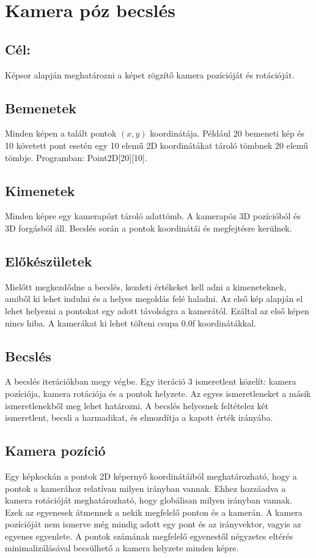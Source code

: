 \documentclass{article}
\begin{document}
	
\section{Kamera póz becslés}
\subsection{Cél:}
Képsor alapján meghatározni a képet rögzítő kamera pozícióját és rotációját.

\subsection{Bemenetek}
Minden képen a talált pontok $(x, y)$ koordinátája. Például 20 bemeneti kép és 10 követett pont esetén egy 10 elemű 2D koordinátákat tároló tömbnek 20 elemű tömbje. Programban: Point2D[20][10].

\subsection{Kimenetek}
Minden képre egy kamerapózt tároló adattömb. A kamerapóz 3D pozícióból és 3D forgásból áll. Becslés során a pontok koordinátái és megfejtésre kerülnek.

\subsection{Előkészületek}
Mielőtt megkezdődne a becslés, kezdeti értékeket kell adni a kimeneteknek, amiből ki lehet indulni és a helyes megoldás felé haladni. Az első kép alapján el lehet helyezni a pontokat egy adott távolságra a kamerától. Ezáltal az első képen nincs hiba. A kamerákat ki lehet tölteni csupa 0.0f koordinátákkal.

\subsection{Becslés}
A becslés iterációkban megy végbe. Egy iteráció 3 ismeretlent közelít: kamera pozíciója, kamera rotációja és a pontok helyzete. Az egyes ismeretleneket a másik ismeretlenekből meg lehet határozni. A becslés helyesnek feltételez két ismeretlent, becsli a harmadikat, és elmozdítja a kapott érték irányába.

\subsection{Kamera pozíció}
Egy képkockán a pontok 2D képernyő koordinátáiból meghatározható, hogy a pontok a kamerához relatívan milyen irányban vannak. Ehhez hozzáadva a kamera rotációját meghatározható, hogy globálisan milyen irányban vannak. Ezek az egyenesek átmennek a nekik megfelelő ponton és a kamerán. A kamera pozícióját nem ismerve még mindig adott egy pont és az irányvektor, vagyis az egyenes egyenlete. A pontok számának megfelelő egyenestől négyzetes eltérés minimalizálásával becsülhető a kamera helyzete minden képre.
\end{document}
